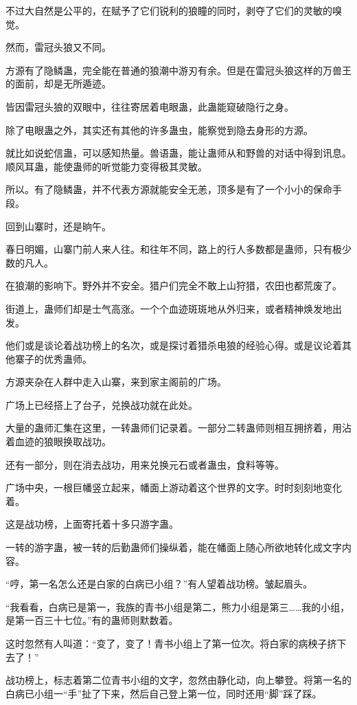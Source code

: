 \begin{this_body}
不过大自然是公平的，在赋予了它们锐利的狼瞳的同时，剥夺了它们的灵敏的嗅觉。

然而，雷冠头狼又不同。

方源有了隐鳞蛊，完全能在普通的狼潮中游刃有余。但是在雷冠头狼这样的万兽王的面前，却是无所遁迹。

皆因雷冠头狼的双眼中，往往寄居着电眼蛊，此蛊能窥破隐行之身。

除了电眼蛊之外，其实还有其他的许多蛊虫，能察觉到隐去身形的方源。

就比如说蛇信蛊，可以感知热量。兽语蛊，能让蛊师从和野兽的对话中得到讯息。顺风耳蛊，能使蛊师的听觉能力变得极其灵敏。

所以。有了隐鳞蛊，并不代表方源就能安全无恙，顶多是有了一个小小的保命手段。

回到山寨时，还是晌午。

春日明媚，山寨门前人来人往。和往年不同，路上的行人多数都是蛊师，只有极少数的凡人。

在狼潮的影响下。野外并不安全。猎户们完全不敢上山狩猎，农田也都荒废了。

街道上，蛊师们却是士气高涨。一个个血迹斑斑地从外归来，或者精神焕发地出发。

他们或是谈论着战功榜上的名次，或是探讨着猎杀电狼的经验心得。或是议论着其他寨子的优秀蛊师。

方源夹杂在人群中走入山寨，来到家主阁前的广场。

广场上已经搭上了台子，兑换战功就在此处。

大量的蛊师汇集在这里，一转蛊师们记录着。一部分二转蛊师则相互拥挤着，用沾着血迹的狼眼换取战功。

还有一部分，则在消去战功，用来兑换元石或者蛊虫，食料等等。

广场中央，一根巨幡竖立起来，幡面上游动着这个世界的文字。时时刻刻地变化着。

这是战功榜，上面寄托着十多只游字蛊。

一转的游字蛊，被一转的后勤蛊师们操纵着，能在幡面上随心所欲地转化成文字内容。

“哼，第一名怎么还是白家的白病已小组？”有人望着战功榜。皱起眉头。

“我看看，白病已是第一，我族的青书小组是第二，熊力小组是第三……我的小组，是第一百三十七位。”有的蛊师则默数着。

这时忽然有人叫道：“变了，变了！青书小组上了第一位次。将白家的病秧子挤下去了！”

战功榜上，标志着第二位青书小组的文字，忽然由静化动，向上攀登。将第一名的白病已小组一“手”扯了下来，然后自己登上第一位，同时还用“脚”踩了踩。


\end{this_body}
